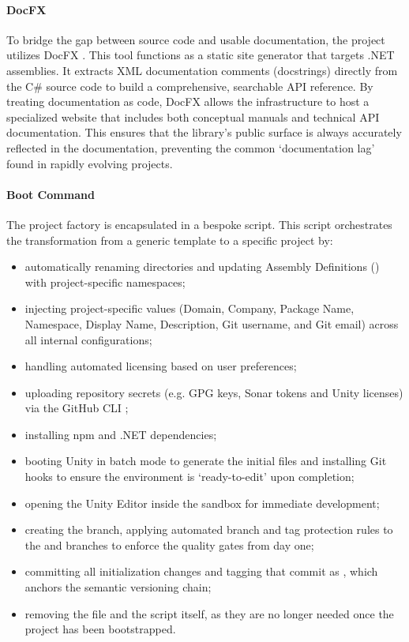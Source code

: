 \paragraph{DocFX}
To bridge the gap between source code and usable documentation, the project utilizes DocFX \cite{docfx}. This tool functions as a static site generator that targets .NET assemblies. It extracts XML documentation comments (docstrings) directly from the C\# source code to build a comprehensive, searchable \ac{API} reference. By treating documentation as code, DocFX allows the infrastructure to host a specialized website that includes both conceptual manuals and technical \ac{API} documentation. This ensures that the library's public surface is always accurately reflected in the documentation, preventing the common `documentation lag' found in rapidly evolving projects.

\paragraph{Boot Command}
The project factory is encapsulated in a bespoke  script. This script orchestrates the transformation from a generic template to a specific project by:
\begin{itemize}
	\item automatically renaming directories and updating Assembly Definitions () \cite{unity_asmdef_2020} with project-specific namespaces;
	\item injecting project-specific values (Domain, Company, Package Name, Namespace, Display Name, Description, Git username, and Git email) across all internal configurations;
	\item handling automated licensing based on user preferences;
	\item uploading repository secrets (e.g. GPG keys, Sonar tokens and Unity licenses) via the GitHub CLI \cite{github_cli_official};
	\item installing npm and .NET dependencies;
	\item booting Unity in batch mode to generate the initial  files and installing Git hooks to ensure the environment is `ready-to-edit' upon completion;
	\item opening the Unity Editor inside the sandbox for immediate development;
	\item creating the  branch, applying automated branch and tag protection rules to the  and  branches to enforce the quality gates from day one;
	\item committing all initialization changes and tagging that commit as , which anchors the semantic versioning chain;
	\item removing the  file and the  script itself, as they are no longer needed once the project has been bootstrapped.
\end{itemize}


